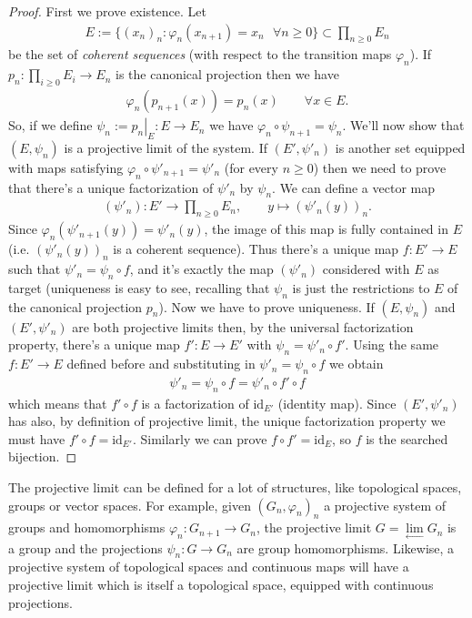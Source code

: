 		\begin{proof}
			First we prove existence. Let 
			\begin{gather*}
				E := \{(x_n)_n : \varphi_n(x_{n+1}) = x_n \text{   } \forall n \geq 0 \} \subset \prod_{n \geq 0} E_n
			\end{gather*}
			be the set of \textit{coherent sequences} (with respect to the transition maps $\varphi_n$). If $p_n\colon \prod_{i \geq 0}E_i \to E_n$ is the canonical projection then we have
			\begin{gather*}
				\varphi_n(p_{n+1}(x)) = p_n(x) \qquad \forall x \in E.
			\end{gather*}
			So, if we define $\psi_n := \left.p_n\right|_E\colon E \to E_n$ we have $\varphi_n \circ \psi_{n+1} = \psi_n$. We'll now show that $(E, \psi_n)$ is a projective limit of the system. If $(E', \psi'_n)$ is another set equipped with maps satisfying $\varphi_n \circ \psi'_{n+1} = \psi'_n$ (for every $n\geq 0$) then we need to prove that there's a unique factorization of $\psi'_n$ by $\psi_n$. We can define a vector map
			\begin{gather*}
				(\psi'_n)\colon E' \to \prod_{n \geq 0}E_n, \qquad y \mapsto (\psi'_n(y))_n.
			\end{gather*} 
			Since $\varphi_n(\psi'_{n+1}(y)) = \psi'_n(y)$, the image of this map is fully contained in $E$ (i.e. $(\psi'_n(y))_n$ is a coherent sequence). Thus there's a unique map $f\colon E' \to E$ such that $\psi'_n = \psi_n \circ f$, and it's exactly the map $(\psi'_n)$ considered with $E$ as target (uniqueness is easy to see, recalling that $\psi_n$ is just the restrictions to $E$ of the canonical projection $p_n$).\newline
			Now we have to prove uniqueness. If $(E, \psi_n)$ and $(E', \psi'_n)$ are both projective limits then, by the universal factorization property, there's a unique map $f'\colon E \to E'$ with $\psi_n = \psi'_n \circ f'$. Using the same $f\colon E' \to E$ defined before and substituting in $\psi'_n = \psi_n \circ f$ we obtain
			\begin{gather*}
				\psi'_n = \psi_n \circ f = \psi'_n \circ f' \circ f
			\end{gather*}
			which means that $f' \circ f$ is a factorization of $\text{id}_{E'}$ (identity map). Since $(E', \psi'_n)$ has also, by definition of projective limit, the unique factorization property we must have $f' \circ f = \text{id}_{E'}$. Similarly we can prove $f \circ f' = \text{id}_E$, so $f$ is the searched bijection.
		\end{proof}
		The projective limit can be defined for a lot of structures, like topological spaces, groups or vector spaces. For example, given $(G_n, \varphi_n)_n$ a projective system of groups and homomorphisms $\varphi_n\colon G_{n+1} \to G_n$, the projective limit $G=\lim\limits_{\longleftarrow}G_n$ is a group and the projections $\psi_n\colon G \to G_n$ are group homomorphisms. Likewise, a projective system of topological spaces and continuous maps will have a projective limit which is itself a topological space, equipped with continuous projections.
		
